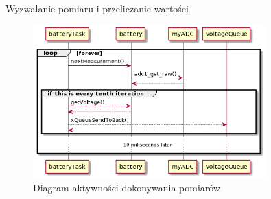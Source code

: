  
        
        \begin{kod}
          \inputminted[firstline=19, lastline=44]{cpp}{esp/listings/adc.cpp}
          \caption{Wyzwalanie pomiaru i przeliczanie wartości}
          \label{code:adc2}
          \vspace{2em}
        \end{kod}
        
        
        \begin{figure}[ht]
          \centering
          \includegraphics[width=0.8\textwidth]{img/adc_uml.png}
          \caption{Diagram aktywności dokonywania pomiarów}
          \label{fig:adc_plantuml}
        \end{figure}
 
        
        
        
        
        
        
        